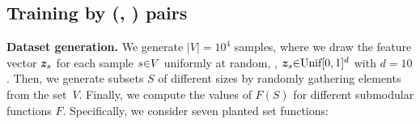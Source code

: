 \documentclass{article}
\newcommand{\xhdr}[1]{\noindent\textbf{#1.}}
\renewcommand{\cite}{\citep}
\begin{document}
\subsection{Training by (\tset, \tvalue) pairs}
\label{sec:syn-setup}
\xhdr{Dataset generation} We generate $|V|{=}10^4$ samples, where we draw the feature vector $\bm{z}_s$ for each sample $s{\in}V$ uniformly  at random, \ie,
$\bm{z}_s{\in}\text{Unif}[0,1]^{d}$ with $d{=}10$. Then, we generate subsets $S$ of different sizes by randomly gathering elements from the set~$V$. 
Finally, we compute the values of $F(S)$ for different submodular functions $F$.
Specifically, we consider seven planted set functions:
%
%
\end{document}
